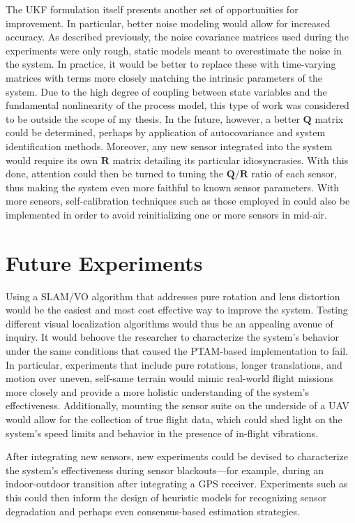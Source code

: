 The UKF formulation itself presents another set of opportunities for improvement. In particular, better noise modeling would allow for increased accuracy. As described previously, the noise covariance matrices used during the experiments were only rough, static models meant to overestimate the noise in the system. In practice, it would be better to replace these with time-varying matrices with terms more closely matching the intrinsic parameters of the system. Due to the high degree of coupling between state variables and the fundamental nonlinearity of the process model, this type of work was considered to be outside the scope of my thesis. In the future, however, a better $\mathbf{Q}$ matrix could be determined, perhaps by application of autocovariance and system identification methods. Moreover, any new sensor integrated into the system would require its own $\mathbf{R}$ matrix detailing its particular idiosyncrasies. With this done, attention could then be turned to tuning the $\mathbf{Q} / \mathbf{R}$ ratio of each sensor, thus making the system even more faithful to known sensor parameters. With more sensors, self-calibration techniques such as those employed in \cite{Weiss2012} could also be implemented in order to avoid reinitializing one or more sensors in mid-air.

\section{Future Experiments}

Using a SLAM/VO algorithm that addresses pure rotation and lens distortion would be the easiest and most cost effective way to improve the system. Testing different visual localization algorithms would thus be an appealing avenue of inquiry. It would behoove the researcher to characterize the system's behavior under the same conditions that caused the PTAM-based implementation to fail. In particular, experiments that include pure rotations, longer translations, and motion over uneven, self-same terrain would mimic real-world flight missions more closely and provide a more holistic understanding of the system's effectiveness. Additionally, mounting the sensor suite on the underside of a UAV would allow for the collection of true flight data, which could shed light on the system's speed limits and behavior in the presence of in-flight vibrations.

After integrating new sensors, new experiments could be devised to characterize the system's effectiveness during sensor blackouts---for example, during an indoor-outdoor transition after integrating a GPS receiver. Experiments such as this could then inform the design of heuristic models for recognizing sensor degradation and perhaps even consensus-based estimation strategies. 

